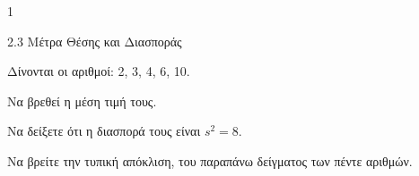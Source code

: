 \begin{ylh}{1}
    \item 2.3 Μέτρα Θέσης και Διασποράς
\end{ylh}
Δίνονται οι αριθμοί: 2, 3, 4, 6, 10.
\begin{alist}
    \item Να βρεθεί η μέση τιμή τους. 
    \item Να δείξετε ότι η διασπορά τους είναι $s^2 = 8$. 
    \item Να βρείτε την τυπική απόκλιση, του παραπάνω δείγματος των πέντε αριθμών. 
\end{alist}

